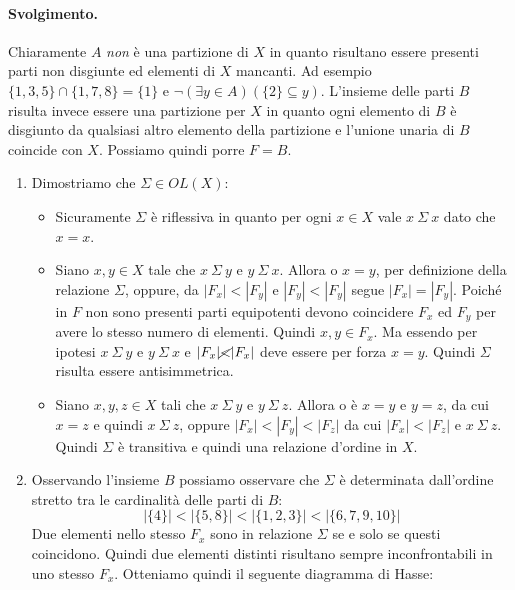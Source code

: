 \paragraph{Svolgimento.} Chiaramente $A$ \textit{non} è una partizione di $X$ in quanto risultano essere presenti parti non disgiunte ed elementi di $X$ mancanti. Ad esempio $\{1,3,5\} \cap \{1,7,8\} = \{1\}$ e $\neg(\exists y \in A)(\{2\}\subseteq y)$. L'insieme delle parti $B$ risulta invece essere una partizione per $X$ in quanto ogni elemento di $B$ è disgiunto da qualsiasi altro elemento della partizione e l'unione unaria di $B$ coincide con $X$. Possiamo quindi porre $F=B$.
\begin{enumerate}[label=(\textit{\roman*})]
	\item Dimostriamo che $\Sigma \in OL(X)$:
	\begin{itemize}
		\item Sicuramente $\Sigma$ è riflessiva in quanto per ogni $x \in X$ vale $x \ \Sigma \ x$ dato che $x=x$.
		\item Siano $x,y \in X$ tale che $x \ \Sigma \ y$ e $y \ \Sigma \ x$. Allora o $x=y$, per definizione della relazione $\Sigma$, oppure, da $|F_{x}|< |F_{y}|$ e $|F_{y}|<|F_{y}|$ segue $|F_{x}|=|F_{y}|$. Poiché in $F$ non sono presenti parti equipotenti devono coincidere $F_{x}$ ed $F_{y}$ per avere lo stesso numero di elementi. Quindi $x,y \in F_{x}$. Ma essendo per ipotesi $x \ \Sigma \ y$ e $y \ \Sigma \ x$ e $|F_{x}| \cancel{<} |F_{x}|$ deve essere per forza $x=y$. Quindi $\Sigma$ risulta essere antisimmetrica.
		\item Siano $x,y,z \in X$ tali che $x \ \Sigma \ y$ e $y \ \Sigma \ z$. Allora o è $x=y$ e $y=z$, da cui $x=z$ e quindi $x \ \Sigma \ z$, oppure $|F_{x}| < |F_{y}| < |F_{z}|$ da cui $|F_{x}| < |F_{z}|$ e $x \ \Sigma \ z$. Quindi $\Sigma$ è transitiva e quindi una relazione d'ordine in $X$.
	\end{itemize}
\item Osservando l'insieme $B$ possiamo osservare che $\Sigma$ è determinata dall'ordine stretto tra le cardinalità delle parti di $B$:
\begin{displaymath}
|\{4\}| < |\{5,8\}| <|\{1,2,3\}| < |\{6,7,9,10\}|
\end{displaymath}
Due elementi nello stesso $F_{x}$ sono in relazione $\Sigma$ se e solo se questi coincidono. Quindi due elementi distinti risultano sempre inconfrontabili in uno stesso $F_{x}$. Otteniamo quindi il seguente diagramma di Hasse:
\begin{center}
	\begin{tikzpicture}

\end{tikzpicture}
\end{center}
\end{enumerate}
